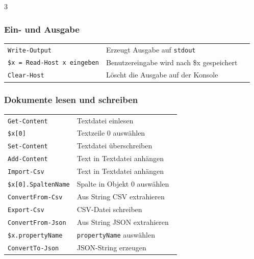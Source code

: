 \documentclass[
11pt,
footheight=40pt
]{scrartcl}
\newif\ifdateiverwaltung \dateiverwaltungtrue
\begin{document}
\begin{paracol}{3}
	\subsubsection*{Ein- und Ausgabe}
	\begin{tabular}{p{0.4\linewidth} p{0.6\linewidth}}
	    \rowcolor{lightyellow} \texttt{Write-Output} & Erzeugt Ausgabe auf \texttt{stdout} \\
	    \texttt{\$x = Read-Host \dq x eingeben\dq} & Benutzereingabe wird nach \$x gespeichert \\
	    \rowcolor{lightyellow}\texttt{Clear-Host} & Löscht die Ausgabe auf der Konsole \\
	\end{tabular}
	\fi
	
	\ifdateiverwaltung 
	\subsubsection*{Dokumente lesen und schreiben}
	\begin{tabular}{p{0.4\linewidth} p{0.6\linewidth}}
	    \rowcolor{lightyellow} \texttt{Get-Content} & Textdatei einlesen \\
	    \texttt{\$x[0]} & Textzeile 0 auswählen \\
	    \rowcolor{lightyellow} \texttt{Set-Content} & Textdatei überschreiben \\
	    \texttt{Add-Content} & Text in Textdatei anhängen \\ \hline
	    
	    \rowcolor{lightblue} \texttt{Import-Csv} & Text in Textdatei anhängen \\
	    \texttt{\$x[0].SpaltenName} & Spalte in Objekt 0 auswählen \\
	    \rowcolor{lightblue} \texttt{ConvertFrom-Csv} & Aus String CSV extrahieren \\
	    \texttt{Export-Csv} & CSV-Datei schreiben\\ \hline
	    
	    \rowcolor{lightpink} \texttt{ConvertFrom-Json} & Aus String JSON extrahieren \\
	    \texttt{\$x.propertyName} & \texttt{propertyName} auswählen \\
	    \rowcolor{lightpink} \texttt{ConvertTo-Json} & JSON-String erzeugen \\
	\end{tabular}
	\fi
	
	\newpage
	\switchcolumn[0]
	

\end{paracol}
\end{document}
